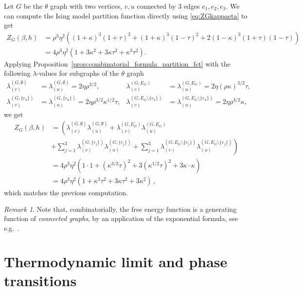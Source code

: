\documentclass{article}
\numberwithin{theorem}{section}
\theoremstyle{remark}
\newtheorem{remark}[theorem]{Remark}
\newenvironment{example}
{\pushQED{\qed}\renewcommand{\qedsymbol}{$\diamond$}\examplex}
{\popQED\endexamplex}
\begin{document}
\begin{example}
Let $G$ be the $\theta$ graph with  two vertices, $v,u$ connected by 3 edges $e_1,e_2,e_3$.
We can compute the Ising model partition function directly using \eqref{eq:ZGkappaeta} to get
\begin{align*}
    Z_G(\beta,h) & = \rho^3 \eta^2 ( (1+\kappa)^3(1+\tau)^2 + (1+\kappa)^3(1-\tau)^2 + 2(1-\kappa)^3(1+\tau)(1-\tau)) \\
    &= 4\rho^3 \eta^2  (1 + 3\kappa^2 + 3\kappa\tau^2 + \kappa^3\tau^2).
\end{align*}
Applying Proposition~\ref{prop:combinatorial_formula_partition_fct} with the following $\lambda$-values for subgraphs of the $\theta$ graph
\begin{align*}
\lambda_{(v)}^{(G,\emptyset)} &=\lambda_{(u)}^{(G,\emptyset)}= 2  \eta \rho^{3/2}, &
\lambda_{(v)}^{(G,E_G)} &=\lambda_{(u)}^{(G,E_G)}= 2 \eta (\rho\kappa)^{3/2} \tau,\\
\lambda_{(v)}^{(G,\{e_k\})} &=\lambda_{(u)}^{(G,\{e_k\})}= 2 \eta 
\rho^{3/2} \kappa^{1/2}\tau, &
\lambda_{(v)}^{(G,E_G \setminus\{e_k\})} &=\lambda_{(u)}^{(G,E_G \setminus\{e_k\})}= 2 \eta 
\rho^{3/2} \kappa,
\end{align*}
we get
\begin{align*}
    Z_G(\beta,h) 
    &= \left(
    \lambda_{(v)}^{(G,\emptyset)}\lambda_{(u)}^{(G,\emptyset)} + \lambda_{(v)}^{(G,E_G)}\lambda_{(u)}^{(G,E_G)} \right. \\
    &\left.
    +\sum_{j=1}^3 
    \lambda_{(v)}^{(G,\{e_j\})}\lambda_{(u)}^{(G,\{e_j\})} +
    \sum_{j=1}^3 
    \lambda_{(v)}^{(G,E_G\setminus\{e_j\})}\lambda_{(u)}^{(G,E_G\setminus\{e_j\})} 
     \right) \\
    &= 4 \rho^3 \eta^2 (1 \cdot 1 + (\kappa^{3/2}\tau)^2 + 3(\kappa^{1/2}\tau)^2 + 3\kappa \cdot \kappa)  \\
    &= 4 \rho^3 \eta^2 (1 + \kappa^3\tau^2 + 3\kappa\tau^2 + 3\kappa^2)\, ,
\end{align*}
which matches the previous computation.
\end{example}

\begin{remark}
  Note that, combinatorially, the free energy function is a generating function of \emph{connected graphs}, by an application of the exponential formula, see e.g.\ \cite[\S 1.4]{bergeron1998combinatorial}.
\end{remark}


\section{Thermodynamic limit and phase transitions}
\label{sec:limit_free_energy}
\end{document}
